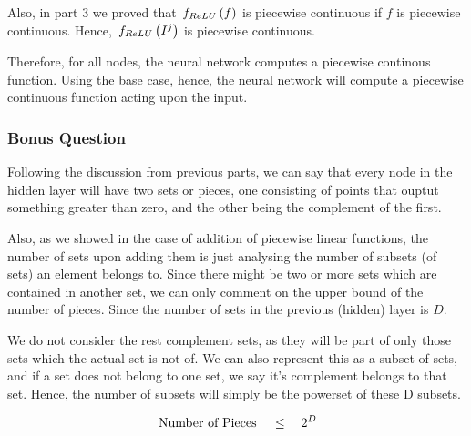 \documentclass{article}
\begin{document}
\begin{mlsolution}
\begin{addmargin}{1.5em}
		Also, in part 3 we proved that $\func{f_{ReLU}}{f}$ is piecewise continuous if $f$ is piecewise continuous. Hence, $\func{f_{ReLU}}{I^j}$ is piecewise continuous.

		Therefore, for all nodes, the neural network computes a piecewise continous function. Using the base case, hence, the neural network will compute a piecewise continuous function acting upon the input.

	\end{addmargin}

	\subsubsection{Bonus Question}

	Following the discussion from previous parts, we can say that every node in the hidden layer will have two sets or pieces, one consisting of points that ouptut something greater than zero, and the other being the complement of the first. \br%

	Also, as we showed in the case of addition of piecewise linear functions, the number of sets upon adding them is just analysing the number of subsets (of sets) an element belongs to. Since there might be two or more sets which are contained in another set, we can only comment on the upper bound of the number of pieces. Since the number of sets in the previous (hidden) layer is $D$. \br%

	We do not consider the rest complement sets, as they will be part of only those sets which the actual set is not of. We can also represent this as a subset of sets, and if a set does not belong to one set, we say it's complement belongs to that set. Hence, the number of subsets will simply be the powerset of these D subsets.

	\[ \,\text{Number of Pieces}\,	\quad \le \quad	2^D \]

\end{mlsolution}
\end{document}
